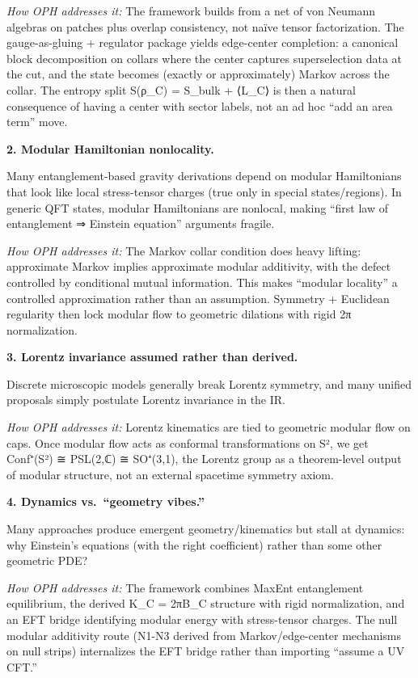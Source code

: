 \documentclass[11pt,a4paper]{article}
\theoremstyle{remark}
\begin{document}
\emph{How OPH addresses it:} The framework builds from a net of von Neumann algebras on patches plus overlap consistency, not naïve tensor factorization. The gauge-as-gluing + regulator package yields edge-center completion: a canonical block decomposition on collars where the center captures superselection data at the cut, and the state becomes (exactly or approximately) Markov across the collar. The entropy split S(ρ\_C) = S\_bulk + ⟨L\_C⟩ is then a natural consequence of having a center with sector labels, not an ad hoc ``add an area term'' move.

\textbf{2. Modular Hamiltonian nonlocality.}

Many entanglement-based gravity derivations depend on modular Hamiltonians that look like local stress-tensor charges (true only in special states/regions). In generic QFT states, modular Hamiltonians are nonlocal, making ``first law of entanglement ⇒ Einstein equation'' arguments fragile.

\emph{How OPH addresses it:} The Markov collar condition does heavy lifting: approximate Markov implies approximate modular additivity, with the defect controlled by conditional mutual information. This makes ``modular locality'' a controlled approximation rather than an assumption. Symmetry + Euclidean regularity then lock modular flow to geometric dilations with rigid 2π normalization.

\textbf{3. Lorentz invariance assumed rather than derived.}

Discrete microscopic models generally break Lorentz symmetry, and many unified proposals simply postulate Lorentz invariance in the IR.

\emph{How OPH addresses it:} Lorentz kinematics are tied to geometric modular flow on caps. Once modular flow acts as conformal transformations on S², we get Conf⁺(S²) ≅ PSL(2,ℂ) ≅ SO⁺(3,1), the Lorentz group as a theorem-level output of modular structure, not an external spacetime symmetry axiom.

\textbf{4. Dynamics vs.~``geometry vibes.''}

Many approaches produce emergent geometry/kinematics but stall at dynamics: why Einstein's equations (with the right coefficient) rather than some other geometric PDE?

\emph{How OPH addresses it:} The framework combines MaxEnt entanglement equilibrium, the derived K\_C = 2πB\_C structure with rigid normalization, and an EFT bridge identifying modular energy with stress-tensor charges. The null modular additivity route (N1-N3 derived from Markov/edge-center mechanisms on null strips) internalizes the EFT bridge rather than importing ``assume a UV CFT.''
\end{document}
